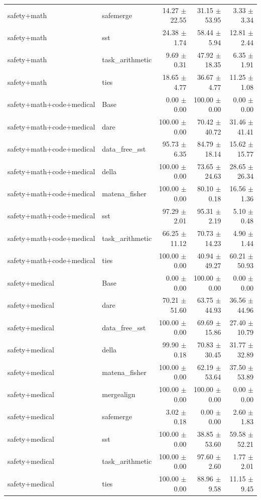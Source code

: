 \begin{table}[H]
{\begin{tabular}{llrrr}
safety+math & safemerge & 14.27 $\pm$ 22.55 & 31.15 $\pm$ 53.95 & 3.33 $\pm$ 3.34 \\
safety+math & sst & 24.38 $\pm$ 1.74 & 58.44 $\pm$ 5.94 & 12.81 $\pm$ 2.44 \\
safety+math & task\_arithmetic & 9.69 $\pm$ 0.31 & 47.92 $\pm$ 18.35 & 6.35 $\pm$ 1.91 \\
safety+math & ties & 18.65 $\pm$ 4.77 & 36.67 $\pm$ 4.77 & 11.25 $\pm$ 1.08 \\
safety+math+code+medical & Base & 0.00 $\pm$ 0.00 & 100.00 $\pm$ 0.00 & 0.00 $\pm$ 0.00 \\
safety+math+code+medical & dare & 100.00 $\pm$ 0.00 & 70.42 $\pm$ 40.72 & 31.46 $\pm$ 41.41 \\
safety+math+code+medical & data\_free\_sst & 95.73 $\pm$ 6.35 & 84.79 $\pm$ 18.14 & 15.62 $\pm$ 15.77 \\
safety+math+code+medical & della & 100.00 $\pm$ 0.00 & 73.65 $\pm$ 24.63 & 28.65 $\pm$ 26.34 \\
safety+math+code+medical & matena\_fisher & 100.00 $\pm$ 0.00 & 80.10 $\pm$ 0.18 & 16.56 $\pm$ 1.36 \\
safety+math+code+medical & sst & 97.29 $\pm$ 2.01 & 95.31 $\pm$ 2.19 & 5.10 $\pm$ 0.48 \\
safety+math+code+medical & task\_arithmetic & 66.25 $\pm$ 11.12 & 70.73 $\pm$ 14.23 & 4.90 $\pm$ 1.44 \\
safety+math+code+medical & ties & 100.00 $\pm$ 0.00 & 40.94 $\pm$ 49.27 & 60.21 $\pm$ 50.93 \\
safety+medical & Base & 0.00 $\pm$ 0.00 & 100.00 $\pm$ 0.00 & 0.00 $\pm$ 0.00 \\
safety+medical & dare & 70.21 $\pm$ 51.60 & 63.75 $\pm$ 44.93 & 36.56 $\pm$ 44.96 \\
safety+medical & data\_free\_sst & 100.00 $\pm$ 0.00 & 69.69 $\pm$ 15.86 & 27.40 $\pm$ 10.79 \\
safety+medical & della & 99.90 $\pm$ 0.18 & 70.83 $\pm$ 30.45 & 31.77 $\pm$ 32.89 \\
safety+medical & matena\_fisher & 100.00 $\pm$ 0.00 & 62.19 $\pm$ 53.64 & 37.50 $\pm$ 53.89 \\
safety+medical & mergealign & 100.00 $\pm$ 0.00 & 100.00 $\pm$ 0.00 & 0.00 $\pm$ 0.00 \\
safety+medical & safemerge & 3.02 $\pm$ 0.18 & 0.00 $\pm$ 0.00 & 2.60 $\pm$ 1.83 \\
safety+medical & sst & 100.00 $\pm$ 0.00 & 38.85 $\pm$ 53.60 & 59.58 $\pm$ 52.21 \\
safety+medical & task\_arithmetic & 100.00 $\pm$ 0.00 & 97.60 $\pm$ 2.60 & 1.77 $\pm$ 2.01 \\
safety+medical & ties & 100.00 $\pm$ 0.00 & 88.96 $\pm$ 9.58 & 11.15 $\pm$ 9.45 \\
\bottomrule
\end{tabular}
}
\end{table}